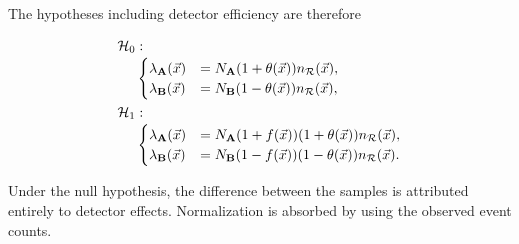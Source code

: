\documentclass[paper/ddppaper2.tex]{subfiles}
\begin{document}
The hypotheses including detector efficiency are therefore

\begin{equation}
\begin{aligned}
    {{\mathcal{H}_{0}}} &:\\[-0.5ex]
    &\begin{cases}
        {{\lambda}_{{\mathbf{A}}}(\vec{{x}})}
        &=
        N_{{\mathbf{A}}}
        (1 + {\theta}(\vec{{x}})) n_{\mathcal{R}}({\vec{{x}}}),
        \\
        {{\lambda}_{{\mathbf{B}}}(\vec{{x}})}
        &=
        N_{{\mathbf{B}}}
        (1 - {\theta}(\vec{{x}}))n_{\mathcal{R}}({\vec{{x}}}),
    \end{cases} \\
    {\mathcal{H}_{1}} &:\\[-0.5ex]
    &\begin{cases}
        {{\lambda}_{{\mathbf{A}}}(\vec{{x}})}
        &=
        N_{{\mathbf{A}}}
        (1 + f(\vec{{x}})) (1 + {\theta}(\vec{{x}}))n_{\mathcal{R}}({\vec{{x}}}),
        \\
        {{\lambda}_{{\mathbf{B}}}(\vec{{x}})}
        &=
        N_{{\mathbf{B}}}
        (1 - f(\vec{{x}})) (1 - {\theta}(\vec{{x}}))n_{\mathcal{R}}({\vec{{x}}}).
    \end{cases}
\end{aligned}
\end{equation}

Under the null hypothesis, the difference between the samples is attributed entirely to detector effects. Normalization is absorbed by using the observed event counts.
\end{document}
